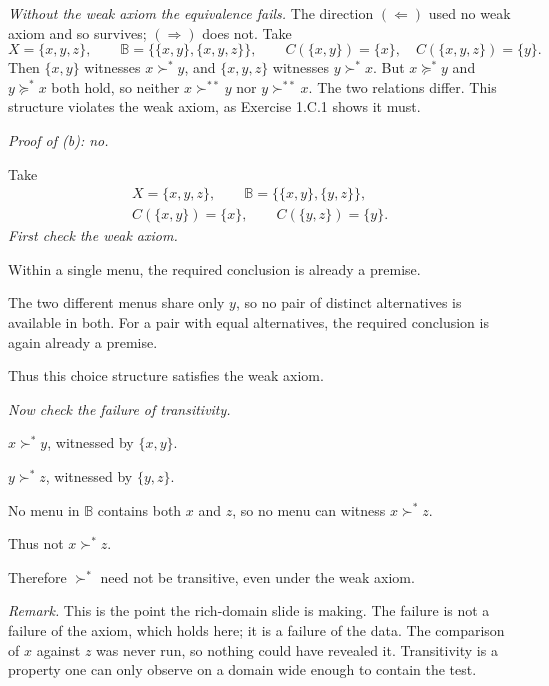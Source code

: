 \documentclass[12pt]{article}
\makeatletter
\newlength{\plevel}\setlength{\plevel}{2.25em}
\newenvironment{pstep}
  {\par\nobreak\begin{list}{}{%
     \setlength{\leftmargin}{\plevel}%
     \setlength{\rightmargin}{0pt}%
     \@beginparpenalty=10000\relax
     \@endparpenalty=10000\relax
     \setlength{\labelwidth}{0pt}\setlength{\labelsep}{0pt}%
     \setlength{\itemindent}{0pt}\setlength{\listparindent}{0pt}%
     \setlength{\topsep}{0pt}\setlength{\partopsep}{0pt}%
     \setlength{\parsep}{0pt}\setlength{\itemsep}{0pt}}%
   \item\relax}
  {\end{list}}
\newif\ifboardproofboxed
\renewenvironment{proof}[1][\proofname]
  {\par\addvspace{.7\baselineskip}\Needspace{5\baselineskip}%
   \ifboardproofboxed\noindent\begin{minipage}{\linewidth}\fi
   \pushQED{\qed}\normalfont
   \topsep0pt\relax
   \trivlist\item\relax
   \setlength{\parindent}{0pt}\setlength{\listparindent}{0pt}%
   \setlength{\parskip}{0pt}%
   \textit{#1.}\par\nobreak}
  {\popQED\endtrivlist\@endpefalse
   \ifboardproofboxed\end{minipage}\par\fi}
\newenvironment{remark}
  {\par\medskip\noindent\textit{Remark.}\enspace}
  {\par\medskip}
\makeatother
\begin{document}
\noindent
\emph{Without the weak axiom the equivalence fails.} The direction
$(\Leftarrow)$ used no weak axiom and so survives; $(\Rightarrow)$ does not.
Take
\[
X=\{x,y,z\},\qquad
\mathbb B=\bigl\{\{x,y\},\{x,y,z\}\bigr\},\qquad
C(\{x,y\})=\{x\},\quad C(\{x,y,z\})=\{y\}.
\]
Then $\{x,y\}$ witnesses $x\succ^{*}y$, and $\{x,y,z\}$ witnesses
$y\succ^{*}x$. But $x\succeq^{*}y$ and $y\succeq^{*}x$ both hold, so neither
$x\succ^{**}y$ nor $y\succ^{**}x$. The two relations differ. This structure
violates the weak axiom, as Exercise 1.C.1 shows it must.

\begin{proof}[Proof of (b): no]
  Take
  \[
  \begin{gathered}
    X=\{x,y,z\},\qquad
    \mathbb B=\bigl\{\{x,y\},\{y,z\}\bigr\},\\
    C(\{x,y\})=\{x\},\qquad C(\{y,z\})=\{y\}.
  \end{gathered}
  \]
  \emph{First check the weak axiom.}
  \begin{pstep}
    Within a single menu, the required conclusion is already a premise.

    The two different menus share only $y$, so no pair of distinct alternatives
    is available in both. For a pair with equal alternatives, the required
    conclusion is again already a premise.
  \end{pstep}
  Thus this choice structure satisfies the weak axiom.

  \emph{Now check the failure of transitivity.}
  \begin{pstep}
    $x\succ^{*}y$, witnessed by $\{x,y\}$.

    $y\succ^{*}z$, witnessed by $\{y,z\}$.

    No menu in $\mathbb B$ contains both $x$ and $z$, so no menu can witness
    $x\succ^{*}z$.

    Thus not $x\succ^{*}z$.
  \end{pstep}
  Therefore $\succ^{*}$ need not be transitive, even under the weak axiom.
\end{proof}

\begin{remark}
  This is the point the rich-domain slide is making. The failure is not a failure
  of the axiom, which holds here; it is a failure of the data. The comparison of
  $x$ against $z$ was never run, so nothing could have revealed it. Transitivity
  is a property one can only observe on a domain wide enough to contain the test.
\end{remark}
\end{document}
